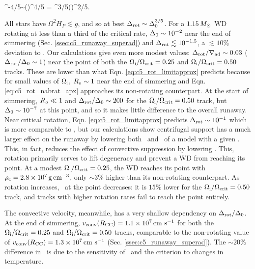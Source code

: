 \eqbegin
\dnabrot {}\rossby^{-4/5}\dnabconvzero \sim \left(\right)^{4/5} = \dnabconvzero^{3/5}\left(\right)^{2/5}.
\label{eq:c5_rot_limitapprox}
\eqend

\noindent All stars have $\Omega^2 H_P \lesssim g$, and so at best $\dnabrot \sim \dnabconvzero^{3/5}$.  For a $1.15\,\Msun$ WD rotating at less than a third of the critical rate, $\dnabconvzero \sim 10^{-2}$ near the end of simmering (Sec. \ref{ssec:c5_runaway_superad}) and $\dnabrot \lesssim 10^{-1.5}$, a $\lesssim10$\% deviation to \nablaad.  Our calculations give even more modest values: $\dnabrot/\nablaad \sim 0.03$ ($\dnabrot/\dnabconvzero \sim 1$) near the \citeal{wooswk04} point of both the $\Ominit/\Omcrit = 0.25$ and $\Ominit/\Omcrit = 0.50$ tracks.  These are lower than what Eqn. \ref{eq:c5_rot_limitapprox} predicts because for small values of $\Ominit$, $\rossby \sim 1$ near the end of simmering and Eqn. \ref{eq:c5_rot_nabrat_apx} approaches its non-rotating counterpart.  At the start of simmering, $\rossby \ll 1$ and $\dnabrot/\dnabconvzero \sim 200$ for the $\Ominit/\Omcrit = 0.50$ track, but $\dnabconvzero \sim 10^{-7}$ at this point, and so it makes little difference to the overall runaway.  Near critical rotation, Eqn. \ref{eq:c5_rot_limitapprox} predicts $\dnabrot \sim 10^{-1}$ which is more comparable to \nablaad, but our calculations show centrifugal support has a much larger effect on the runaway by lowering both \rhoc\ and \Tc\ of a model with a given \Sc.  This, in fact, reduces the effect of convective suppression by lowering \vconv.  This, rotation primarily serves to lift degeneracy and prevent a WD from reaching its \citeal{wooswk04} point.  At a modest $\Ominit/\Omcrit = 0.25$, the WD reaches its \citeal{wooswk04} point with $\rhoc = 2.8\times10^7\,\gcc$, only $\sim3$\% higher than its non-rotating counterpart.  As rotation increases, \rhoc\ at the \citeal{wooswk04} point decreases: it is $15$\% lower for the $\Ominit/\Omcrit = 0.50$ track, and tracks with higher rotation rates fail to reach the \citeal{wooswk04} point entirely.

The convective velocity, meanwhile, has a very shallow dependency on $\dnabrot/\dnabconvzero$.  At the end of simmering, $\vconvrcc = 1.1\times10^7\,\cmpsec$ for both the $\Ominit/\Omcrit = 0.25$ and $\Ominit/\Omcrit = 0.50$ tracks, comparable to the non-rotating value of $\vconvrcc = 1.3\times10^7\,\cmpsec$ (Sec. \ref{ssec:c5_runaway_superad}).  The $\sim20$\% difference in \vconvrcc\ is due to the sensitivity of \epscc\ and the \citeal{wooswk04} criterion to changes in temperature. 

